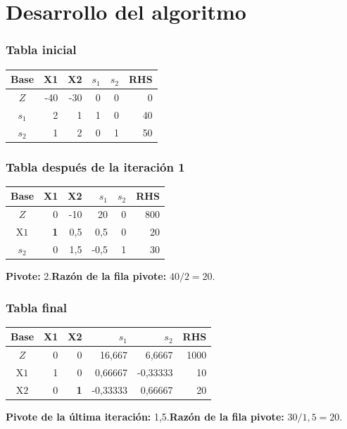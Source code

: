 \documentclass[11pt,oneside]{report}
\begin{document}
\chapter{Desarrollo del algoritmo}
\subsection{Tabla inicial}
\begin{table}[H]\centering\small
{}
\begin{tabular}{crrrrr}\toprule
Base & X1 & X2 & $s_{1}$ & $s_{2}$ & RHS \\
\midrule
$Z$ & -40 & -30 & 0 & 0 & 0 \\
$s_{1}$ & 2 & 1 & 1 & 0 & 40 \\
$s_{2}$ & 1 & 2 & 0 & 1 & 50 \\
\bottomrule\end{tabular}\end{table}
\subsection{Tabla después de la iteración 1}
\begin{table}[H]\centering\small
{}
\begin{tabular}{crrrrr}\toprule
Base & X1 & X2 & $s_{1}$ & $s_{2}$ & RHS \\
\midrule
$Z$ & \cellcolor{verde}0 & -10 & 20 & 0 & 800 \\
$\text{X1}$ & \cellcolor{verde}\cellcolor{dorado!55}\bfseries 1 & 0,5 & 0,5 & 0 & 20 \\
$s_{2}$ & \cellcolor{verde}0 & 1,5 & -0,5 & 1 & 30 \\
\bottomrule\end{tabular}\end{table}
\textbf{Pivote:} 2.\quad \textbf{Razón de la fila pivote:} $40/2 = 20$.\par
\subsection{Tabla final}
\begin{table}[H]\centering\small
{}
\begin{tabular}{crrrrr}\toprule
Base & X1 & X2 & $s_{1}$ & $s_{2}$ & RHS \\
\midrule
$Z$ & 0 & \cellcolor{verde}0 & 16,667 & 6,6667 & 1000 \\
$\text{X1}$ & 1 & \cellcolor{verde}0 & 0,66667 & -0,33333 & 10 \\
$\text{X2}$ & 0 & \cellcolor{verde}\cellcolor{dorado!55}\bfseries 1 & -0,33333 & 0,66667 & 20 \\
\bottomrule\end{tabular}\end{table}
\textbf{Pivote de la última iteración:} 1,5.\quad \textbf{Razón de la fila pivote:} $30/1,5 = 20$.\par
\end{document}
